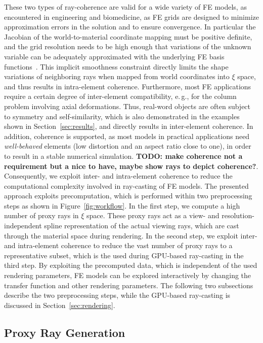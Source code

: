 \documentclass[review,journal]{vgtc}         %
\begin{document}
\noindent These two types of ray-coherence are valid for a wide variety of FE models, as encountered in engineering and biomedicine, as FE grids are designed to minimize approximation errors in the solution and to ensure convergence. In particular the Jacobian of the world-to-material coordinate mapping must be positive definite, and the grid resolution needs to be high enough that variations of the unknown variable can be adequately approximated with the underlying FE basis functions~\cite{knupp07meshquality}. This implicit smoothness constraint directly limits the shape variations of neighboring rays when mapped from world coordinates into $\xi$ space, and thus results in intra-element coherence. Furthermore, most FE applications require a certain degree of inter-element compatibility, e.\,g., for the column problem involving axial deformations. Thus, real-word objects are often subject to symmetry and self-similarity, which is also demonstrated in the examples shown in Section~\ref{sec:results}, and directly results in inter-element coherence. In addition, coherence is supported, as most models in practical applications need {\it well-behaved} elements (low distortion and an aspect ratio close to one), in order to result in a stable numerical simulation. \textbf{TODO: make coherence not a requirement but a nice to have, maybe show rays to depict coherence?}. Consequently, we exploit inter- and intra-element coherence to reduce the computational complexity involved in ray-casting of FE models. The presented approach exploits precomputation, which is performed within two preprocessing steps as shown in Figure~\ref{fig:workflow}. In the first step, we compute a high number of proxy rays in $\xi$ space. These proxy rays act as a view- and resolution-independent spline representation of the actual viewing rays, which are cast through the material space during rendering. In the second step, we exploit inter- and intra-element coherence to reduce the vast number of proxy rays to a representative subset, which is the used during GPU-based ray-casting in the third step. By exploiting the precomputed data, which is independent of the used rendering parameters, FE models can be explored interactively by changing the transfer function and other rendering parameters. The following two subsections describe the two preprocessing steps, while the GPU-based ray-casting is discussed in Section~\ref{sec:rendering}.


\subsection{Proxy Ray Generation}\label{subsec:proxyraygeneration}
\end{document}
